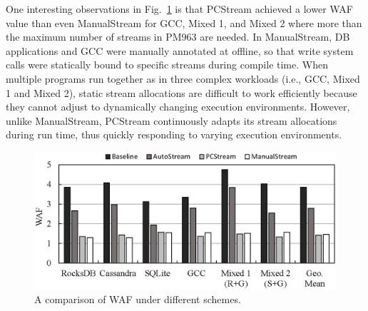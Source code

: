 
One interesting observations in Fig.~\ref{fig:waf} is that \textsf{\small PCStream}
achieved a lower WAF value than even \textsf{\small ManualStream} for GCC, 
Mixed 1, and Mixed 2 where more than the maximum number of streams in PM963
are needed.
In \textsf{ManualStream}, DB applications and GCC were manually annotated at offline, 
so that write system calls were statically bound to specific streams during
compile time.
When multiple programs run together as in three complex workloads 
(i.e., GCC, Mixed 1 and Mixed 2), static stream allocations are difficult to work 
efficiently because they cannot adjust to dynamically changing execution environments. 
However, unlike \textsf{\small ManualStream}, \textsf{\small PCStream} continuously adapts its 
stream allocations during run time, thus quickly responding to varying execution
environments.

\begin{figure}[t]
	\centering
	\includegraphics[width=0.9\linewidth]{figure/waf}
	\caption{A comparison of WAF under different schemes.}
	\label{fig:waf}
	\vspace{-5pt}
\end{figure}



